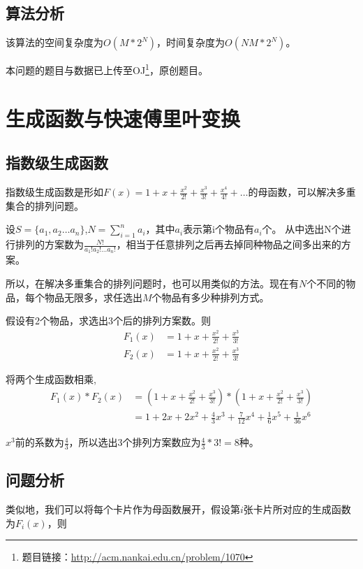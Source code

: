 \documentclass[master]{thesis-uestc}
\begin{document}
\subsection{算法分析}

该算法的空间复杂度为$O(M*2^N)$，时间复杂度为$O(NM*2^N)$。

本问题的题目与数据已上传至OJ\footnote{题目链接：\url{http://acm.nankai.edu.cn/problem/1070} }，原创题目。

\section{生成函数与快速傅里叶变换}

\subsection{指数级生成函数}

指数级生成函数是形如$F(x)=1+x+\frac{x^2}{2!}+\frac{x^3}{3!}+\frac{x^4}{4!}+\dots$的母函数，可以解决多重集合的排列问题。

设$S=\{a_1,a_2\dots a_n\}$,$N=\sum\limits_{i=1}^n{a_i}$，其中$a_i$表示第i个物品有$a_i$个。
从中选出N个进行排列的方案数为$\frac{N!}{a_1!a_2!\dots a_n!}$，相当于任意排列之后再去掉同种物品之间多出来的方案。

所以，在解决多重集合的排列问题时，也可以用类似的方法。现在有$N$个不同的物品，每个物品无限多，求任选出$M$个物品有多少种排列方式。

假设有2个物品，求选出3个后的排列方案数。则
$$
\begin{array}{ll}
    F_1(x)&=1+x+\frac{x^2}{2!}+\frac{x^3}{3!}\\
    F_2(x)&=1+x+\frac{x^2}{2!}+\frac{x^3}{3!}
\end{array}
$$

将两个生成函数相乘,
$$
\begin{array}{ll}
    F_1(x)*F_2(x)&=(1+x+\frac{x^2}{2!}+\frac{x^3}{3!})*(1+x+\frac{x^2}{2!}+\frac{x^3}{3!})\\
    &=1+2x+2x^2+\frac{4}{3}x^3+\frac{7}{12}x^4+\frac{1}{6}x^5+\frac{1}{36}x^6
\end{array}
$$

$x^3$前的系数为$\frac{4}{3}$，所以选出3个排列方案数应为$\frac{4}{3}*3!=8$种。

\subsection{问题分析}

类似地，我们可以将每个卡片作为母函数展开，假设第$i$张卡片所对应的生成函数为$F_i(x)$，则
\end{document}
